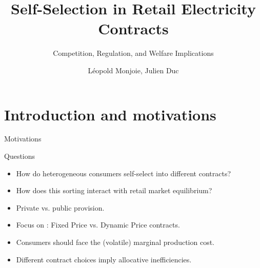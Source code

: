 \documentclass{class}
\title{Self-Selection in Retail Electricity Contracts}
\subtitle{Competition, Regulation, and Welfare Implications}
\author{Léopold Monjoie, Julien Duc}
\institute{Aalto University \and Université Paris Dauphine, PSL Research University}
\begin{document}
\newlength{\tempb}

\frame{\titlepage}

\newcommand{\commentedbox}[2]{%
  \mbox{
    \begin{tabular}[t]{@{}c@{}}
    $\boxed{\displaystyle#1}$\\
    #2
    \end{tabular}%
  }%
}

\newcommand\Wider[2][3em]{%
\makebox[\linewidth][c]{%
  \begin{minipage}{\dimexpr\textwidth+#1\relax}
  \raggedright#2
  \end{minipage}%
  }%
}

\newcommand*\circled[1]{\tikz[baseline=(char.base)]{
            \node[shape=circle,draw,inner sep=2pt] (char) {#1};}}



\section{Introduction and motivations}


\begin{frame}{Motivations}\label{Motivations}

\begin{mainbox}{Questions}
\begin{itemize}
\vspace{0.15 cm}
    \item  How do heterogeneous consumers self-select into different contracts?
        \vspace{0.15 cm}
    \item How does this sorting interact with retail market equilibrium?
      \vspace{0.15 cm}
    \item Private vs. public provision.
    \vspace{0.15 cm}
\end{itemize}
\end{mainbox}

\vfill

\begin{itemize}    
    \item Focus on : Fixed Price vs. Dynamic Price contracts. \vfill
    
    \item {} Consumers should face the (volatile) marginal production cost. \vfill
    
    \item {} Different contract choices imply allocative inefficiencies.
\end{itemize}

       
\end{frame}
\end{document}
